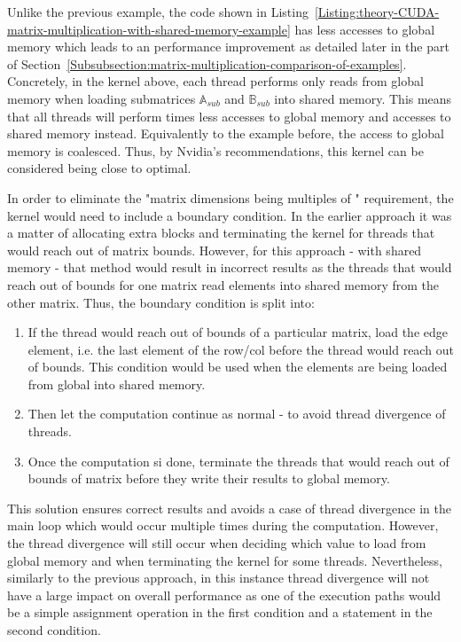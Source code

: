 Unlike the previous example, the code shown in Listing~\ref{Listing:theory-CUDA-matrix-multiplication-with-shared-memory-example} has less accesses to global memory which leads to an performance improvement as detailed later in the \textit{} part of Section~\ref{Subsubsection:matrix-multiplication-comparison-of-examples}. Concretely, in the kernel above, each thread performs only  reads from global memory when loading submatrices $ \mathbb{A}_{sub} $ and $ \mathbb{B}_{sub} $ into shared memory. This means that all threads will perform  times less accesses to global memory and  accesses to shared memory instead. Equivalently to the example before, the access to global memory is coalesced. Thus, by Nvidia's recommendations, this kernel can be considered being close to optimal.

\par In order to eliminate the "matrix dimensions being multiples of " requirement, the kernel would need to include a boundary condition. In the earlier approach it was a matter of allocating extra blocks and terminating the kernel for threads that would reach out of matrix bounds. However, for this approach - with shared memory - that method would result in incorrect results as the threads that would reach out of bounds for one matrix read elements into shared memory from the other matrix. Thus, the boundary condition is split into:

\begin{enumerate}
	\item If the thread would reach out of bounds of a particular matrix, load the edge element, i.e. the last element of the row/col before the thread would reach out of bounds. This condition would be used when the elements are being loaded from global into shared memory.
	\item Then let the computation continue as normal - to avoid thread divergence of threads.
	\item Once the computation si done, terminate the threads that would reach out of bounds of matrix  before they write their results to global memory.
\end{enumerate}

This solution ensures correct results and avoids a case of thread divergence in the main loop which would occur multiple times during the computation. However, the thread divergence will still occur when deciding which value to load from global memory and when terminating the kernel for some threads. Nevertheless, similarly to the previous approach, in this instance thread divergence will not have a large impact on overall performance as one of the execution paths would be a simple assignment operation in the first condition and a  statement in the second condition.

